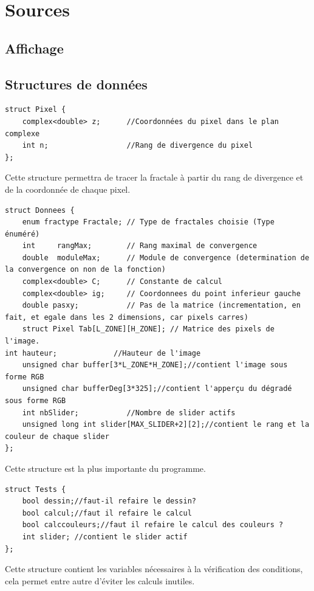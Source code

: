 \documentclass[a4paper,11pt]{article} \usepackage[T1]{fontenc} \usepackage[utf8]{inputenc} \usepackage[francais]{babel}
\begin{document}
\section{Sources}

\subsection{Affichage}%

\subsection{Structures de données}
\begin{lstlisting}
struct Pixel {
    complex<double> z;      //Coordonnées du pixel dans le plan complexe
    int n;                  //Rang de divergence du pixel
};
\end{lstlisting}
Cette structure permettra de tracer la fractale à partir du rang de divergence et de la coordonnée de chaque pixel.
\begin{lstlisting}
struct Donnees {
    enum fractype Fractale; // Type de fractales choisie (Type énuméré)
    int     rangMax;        // Rang maximal de convergence
    double  moduleMax;      // Module de convergence (determination de la convergence on non de la fonction)
    complex<double> C;      // Constante de calcul
    complex<double> ig;     // Coordonnees du point inferieur gauche
    double pasxy;           // Pas de la matrice (incrementation, en fait, et egale dans les 2 dimensions, car pixels carres)
    struct Pixel Tab[L_ZONE][H_ZONE]; // Matrice des pixels de l'image.
int hauteur;             //Hauteur de l'image
    unsigned char buffer[3*L_ZONE*H_ZONE];//contient l'image sous forme RGB
    unsigned char bufferDeg[3*325];//contient l'apperçu du dégradé sous forme RGB
    int nbSlider;           //Nombre de slider actifs
    unsigned long int slider[MAX_SLIDER+2][2];//contient le rang et la couleur de chaque slider
};

\end{lstlisting}
Cette structure est la plus importante du programme.

\begin{lstlisting}
struct Tests {
    bool dessin;//faut-il refaire le dessin?
    bool calcul;//faut il refaire le calcul
    bool calccouleurs;//faut il refaire le calcul des couleurs ?
    int slider; //contient le slider actif
};\end{lstlisting}
Cette structure contient les variables nécessaires à la vérification des conditions, cela permet entre autre d’éviter les calculs inutiles.
\end{document}
